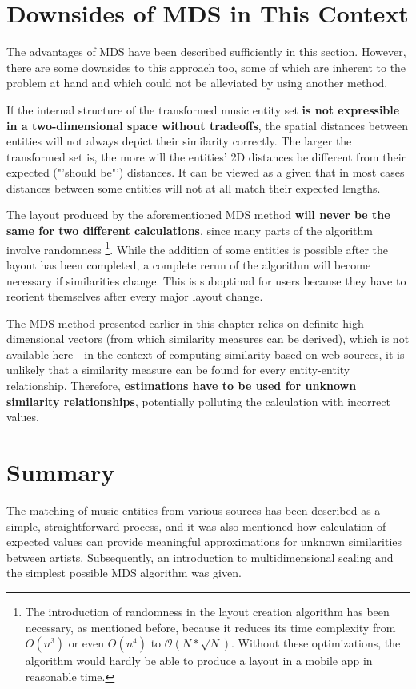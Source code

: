 \section{Downsides of MDS in This Context}

The advantages of MDS have been described sufficiently in this section. However, there are some downsides to this approach too, some of which are inherent to the problem at hand and which could not be alleviated by using another method.

If the internal structure of the transformed music entity set \textbf{is not expressible in a two-dimensional space without tradeoffs}, the spatial distances between entities will not always depict their similarity correctly. The larger the transformed set is, the more will the entities' 2D distances be different from their expected ("'should be"') distances. It can be viewed as a given that in most cases distances between some entities will not at all match their expected lengths.

The layout produced by the aforementioned MDS method \textbf{will never be the same for two different calculations}, since many parts of the algorithm involve randomness 
\footnote{The introduction of randomness in the layout creation algorithm has been necessary, as mentioned before, because it reduces its time complexity from $O(n^3)$ or even $O(n^4)$ to $\mathcal O(N*\sqrt{N})$. Without these optimizations, the algorithm would hardly be able to produce a layout in a mobile app in reasonable time.}.
While the addition of some entities is possible after the layout has been completed, a complete rerun of the algorithm will become necessary if similarities change. This is suboptimal for users because they have to reorient themselves after every major layout change.

The MDS method presented earlier in this chapter relies on definite high-dimensional vectors (from which similarity measures can be derived), which is not available here - in the context of computing similarity based on web sources, it is unlikely that a similarity measure can be found for every entity-entity relationship. Therefore, \textbf{estimations have to be used for unknown similarity relationships}, potentially polluting the calculation with incorrect values.

\section{Summary}

The matching of music entities from various sources has been described as a simple, straightforward process, and it was also mentioned how calculation of expected values can provide meaningful approximations for unknown similarities between artists. Subsequently, an introduction to multidimensional scaling and the simplest possible MDS algorithm was given. 

